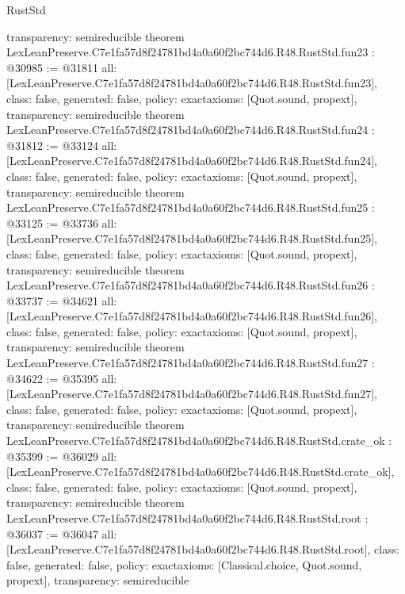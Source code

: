 \begin{lexlean}{RustStd}
\begin{coremodule}
{  transparency: semireducible
}
theorem LexLeanPreserve.C7e1fa57d8f24781bd4a0a60f2bc744d6.R48.RustStd.fun23 : @30985 := @31811 {
  all: [LexLeanPreserve.C7e1fa57d8f24781bd4a0a60f2bc744d6.R48.RustStd.fun23],
  class: false,
  generated: false,
  policy: exact{axioms: [Quot.sound, propext]},
  transparency: semireducible
}
theorem LexLeanPreserve.C7e1fa57d8f24781bd4a0a60f2bc744d6.R48.RustStd.fun24 : @31812 := @33124 {
  all: [LexLeanPreserve.C7e1fa57d8f24781bd4a0a60f2bc744d6.R48.RustStd.fun24],
  class: false,
  generated: false,
  policy: exact{axioms: [Quot.sound, propext]},
  transparency: semireducible
}
theorem LexLeanPreserve.C7e1fa57d8f24781bd4a0a60f2bc744d6.R48.RustStd.fun25 : @33125 := @33736 {
  all: [LexLeanPreserve.C7e1fa57d8f24781bd4a0a60f2bc744d6.R48.RustStd.fun25],
  class: false,
  generated: false,
  policy: exact{axioms: [Quot.sound, propext]},
  transparency: semireducible
}
theorem LexLeanPreserve.C7e1fa57d8f24781bd4a0a60f2bc744d6.R48.RustStd.fun26 : @33737 := @34621 {
  all: [LexLeanPreserve.C7e1fa57d8f24781bd4a0a60f2bc744d6.R48.RustStd.fun26],
  class: false,
  generated: false,
  policy: exact{axioms: [Quot.sound, propext]},
  transparency: semireducible
}
theorem LexLeanPreserve.C7e1fa57d8f24781bd4a0a60f2bc744d6.R48.RustStd.fun27 : @34622 := @35395 {
  all: [LexLeanPreserve.C7e1fa57d8f24781bd4a0a60f2bc744d6.R48.RustStd.fun27],
  class: false,
  generated: false,
  policy: exact{axioms: [Quot.sound, propext]},
  transparency: semireducible
}
theorem LexLeanPreserve.C7e1fa57d8f24781bd4a0a60f2bc744d6.R48.RustStd.crate_ok : @35399 := @36029 {
  all: [LexLeanPreserve.C7e1fa57d8f24781bd4a0a60f2bc744d6.R48.RustStd.crate_ok],
  class: false,
  generated: false,
  policy: exact{axioms: [Quot.sound, propext]},
  transparency: semireducible
}
theorem LexLeanPreserve.C7e1fa57d8f24781bd4a0a60f2bc744d6.R48.RustStd.root : @36037 := @36047 {
  all: [LexLeanPreserve.C7e1fa57d8f24781bd4a0a60f2bc744d6.R48.RustStd.root],
  class: false,
  generated: false,
  policy: exact{axioms: [Classical.choice, Quot.sound, propext]},
  transparency: semireducible
}


\end{coremodule}
\end{lexlean}

